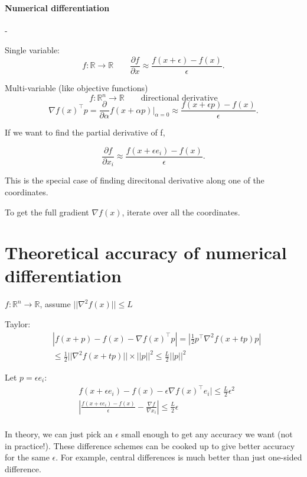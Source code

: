\documentclass{article}
\begin{document}
\paragraph{Numerical differentiation}-

\medskip Single variable:
\[
  f: \mathbb{R} \rightarrow \mathbb{R} \qquad \frac{\partial f}{\partial x} \approx \frac{f(x + \epsilon) - f(x)}{\epsilon}    
.\]

Multi-variable (like objective functions) 
\[
  f: \mathbb{R}^{n} \rightarrow \mathbb{R} \qquad \text{directional derivative}
\] 
\[
  \nabla f(x)^{\top}p = \frac{\partial}{\partial \alpha} f(x + \alpha p) \big|_{\alpha = 0} \approx \frac{f(x+ \epsilon p) - f(x)}{\epsilon}
.\] 

If we want to find the partial derivative of f,

\[
  \frac{\partial f}{\partial x_i} \approx \frac{f(x + \epsilon e_i) - f(x)}{\epsilon}
.\] 

This is the special case of finding direcitonal derivative along one of the coordinates. 


To get the full gradient $\nabla f(x)$, iterate over all the coordinates. 

\section{Theoretical accuracy of numerical differentiation}

$f: \mathbb{R}^{n} \rightarrow \mathbb{R}$, assume $||\nabla ^2 f(x)|| \leq L$

\medskip Taylor: 
\begin{align*}
  &|f(x+p) - f(x) - \nabla f(x)^{\top}p| = | \frac{1}{2}p^{\top} \nabla ^2 f(x+tp) p| \\ 
  & \leq \frac{1}{2}||\nabla ^2 f(x+tp)|| \times ||p||^2 \leq \frac{L}{2}||p||^2   
\end{align*}

Let $p = \epsilon e_i$:
\begin{align*}
  &f(x+\epsilon e_i) - f(x) - \epsilon \nabla f(x)^{\top}e_i|  \leq \frac{L}{2}\epsilon ^2 \\ 
  &| \frac{f(x+\epsilon e_i) - f(x)}{\epsilon} - \frac{\nabla f}{\nabla x_i}| \leq \frac{L}{2}\epsilon  \\ 
\end{align*}

In theory, we can just pick an $\epsilon$ small enough to get any accuracy we want (not in practice!). 
These difference schemes can be cooked up to give better accuracy for the same $\epsilon$. For example, central differences
is much better than just one-sided difference. 
\end{document}
